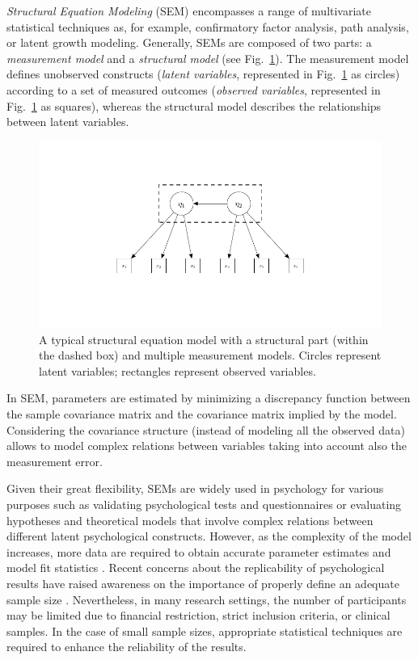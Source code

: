 \documentclass[graybox]{svmult}
\begin{document}
\emph{Structural Equation Modeling} (SEM) encompasses  a range of multivariate statistical techniques as, for example, confirmatory factor analysis, path analysis, or latent growth modeling. Generally, SEMs are composed of two parts: a \emph{measurement model} and a \emph{structural model} (see Fig.~\ref{fig:example_sem}).   The measurement model defines unobserved constructs (\emph{latent variables}, represented in Fig.~\ref{fig:example_sem} as circles) according to a set of measured outcomes (\emph{observed variables}, represented in Fig.~\ref{fig:example_sem} as squares), whereas the structural model describes the relationships between latent variables.
\begin{figure}[b]
	\sidecaption
	\label{fig:example_sem}
	\includegraphics[width = .50\textwidth]{figure/Plot_SEM}
	\caption{A typical structural equation model with a structural part (within the dashed box) and multiple measurement models. Circles represent latent variables; rectangles represent observed variables.}
\end{figure}

In SEM, parameters are estimated by minimizing a discrepancy function between the sample covariance matrix and the covariance matrix implied by the model. Considering the covariance structure (instead of modeling all the observed data) allows to model complex relations between variables taking into account also the  measurement error.

Given their great flexibility, SEMs are widely used in psychology for various purposes such as validating psychological tests and questionnaires or evaluating hypotheses and theoretical models that involve complex relations between different latent psychological constructs. However, as the complexity of the model increases, more data are required to obtain accurate parameter estimates and model fit statistics \cite{wolfSampleSizeRequirements2013}.
Recent concerns about the replicability of psychological results have raised awareness on the importance of properly define an adequate sample size \cite{ioannidisWhyMostPublished2005, opensciencecollaborationEstimatingReproducibilityPsychological2015}.
Nevertheless, in many research settings, the number of participants may be limited due to financial restriction, strict inclusion criteria, or clinical samples. In the case of small sample sizes, appropriate statistical techniques are required to enhance the reliability of the results.
\end{document}
